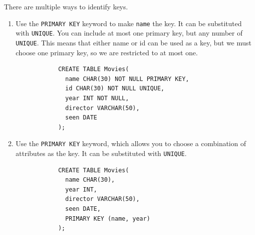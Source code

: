 \documentclass{article}
\begin{document}
      \begin{definition}
        There are multiple ways to identify keys. 
        \begin{enumerate}
          \item Use the \texttt{PRIMARY KEY} keyword to make \texttt{name} the key. It can be substituted with \texttt{UNIQUE}. You can include at most one primary key, but any number of \texttt{UNIQUE}. This means that either name or id can be used as a key, but we must choose one primary key, so we are restricted to at most one. 
          \begin{lstlisting}
            CREATE TABLE Movies(
              name CHAR(30) NOT NULL PRIMARY KEY,
              id CHAR(30) NOT NULL UNIQUE,
              year INT NOT NULL, 
              director VARCHAR(50), 
              seen DATE
            ); 
          \end{lstlisting}

          \item Use the \texttt{PRIMARY KEY} keyword, which allows you to choose a combination of attributes as the key. It can be substituted with \texttt{UNIQUE}. 
          \begin{lstlisting}
            CREATE TABLE Movies(
              name CHAR(30),
              year INT, 
              director VARCHAR(50), 
              seen DATE, 
              PRIMARY KEY (name, year)
            ); 
          \end{lstlisting}
        \end{enumerate}
      \end{definition}
\end{document}
